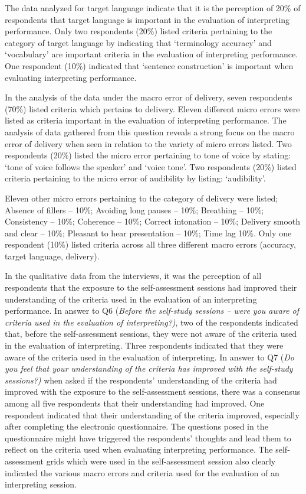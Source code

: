 \documentclass[output=paper]{langsci/langscibook}
\begin{document}
The data analyzed for target language indicate that it is the perception of 20\% of respondents that target language is important in the evaluation of interpreting performance. Only two respondents (20\%) listed criteria pertaining to the category of target language by indicating that ‘terminology accuracy’ and ‘vocabulary’ are important criteria in the evaluation of interpreting performance. One respondent (10\%) indicated that ‘sentence construction’ is important when evaluating interpreting performance. 

In the analysis of the data under the macro error of delivery, seven respondents (70\%) listed criteria which pertains to delivery. Eleven different micro errors were listed as criteria important in the evaluation of interpreting performance. The analysis of data gathered from this question reveals a strong focus on the macro error of delivery when seen in relation to the variety of micro errors listed. Two respondents (20\%) listed the micro error pertaining to tone of voice by stating: ‘tone of voice follows the speaker’ and ‘voice tone’. Two respondents (20\%) listed criteria pertaining to the micro error of audibility by listing: ‘audibility’. 

Eleven other micro errors pertaining to the category of delivery were listed; Absence of fillers – 10\%; Avoiding long pauses – 10\%; Breathing – 10\%; Consistency – 10\%; Coherence – 10\%; Correct intonation – 10\%; Delivery smooth and clear – 10\%; Pleasant to hear presentation – 10\%; Time lag 10\%. Only one respondent (10\%) listed criteria across all three different macro errors (accuracy, target language, delivery).

In the qualitative data from the interviews, it was the perception of all respondents that the exposure to the self-assessment sessions had improved their understanding of the criteria used in the evaluation of an interpreting performance. In answer to Q6 (\textit{Before the self-study sessions – were you aware of criteria used in the evaluation of interpreting?)}, two of the respondents indicated that, before the self-assessment sessions, they were not aware of the criteria used in the evaluation of interpreting. Three respondents indicated that they were aware of the criteria used in the evaluation of interpreting. In answer to Q7 (\textit{Do you feel that your understanding of the criteria has improved with the self-study sessions?)} when asked if the respondents’ understanding of the criteria had improved with the exposure to the self-assessment sessions, there was a consensus among all five respondents that their understanding had improved. One respondent indicated that their understanding of the criteria improved, especially after completing the electronic questionnaire. The questions posed in the questionnaire might have triggered the respondents’ thoughts and lead them to reflect on the criteria used when evaluating interpreting performance. The self-assessment grids which were used in the self-assessment session also clearly indicated the various macro errors and criteria used for the evaluation of an interpreting session. 
\end{document}
